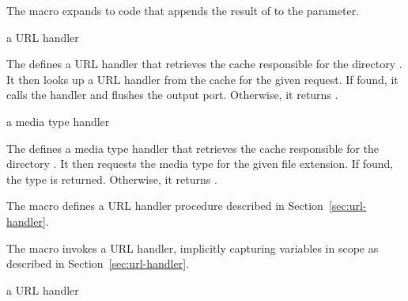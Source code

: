 \begin{syntax}
\end{syntax}

The  macro expands to code that appends the
result of  to the
 parameter.

\begin{procedure}
\end{procedure}
\returns{} a URL handler

The  defines a URL handler
that retrieves the cache responsible for the directory . It
then looks up a URL handler from the cache for the given request. If
found, it calls the handler and flushes the output port. Otherwise, it
returns .

\begin{procedure}
\end{procedure}
\returns{} a media type handler

The  defines a media type
handler that retrieves the cache responsible for the directory
. It then requests the media type for the given file
extension. If found, the type is returned. Otherwise, it returns
.

\begin{syntax}
\end{syntax}

The  macro defines a URL handler procedure
described in Section~\ref{sec:url-handler}.

\begin{syntax}
\end{syntax}

The  macro invokes a URL handler,
implicitly capturing variables in scope as described in
Section~\ref{sec:url-handler}.

\begin{procedure}
\end{procedure}
\returns{} a URL handler

